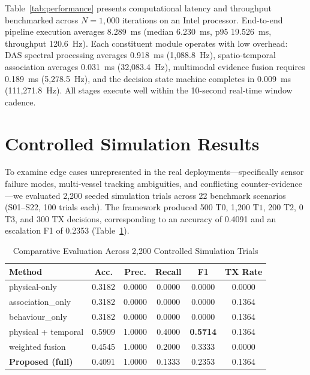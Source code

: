 \documentclass[conference]{IEEEtran}
\newcommand{\dstate}[1]{\ensuremath{\mathrm{#1}}}
\begin{document}
Table~\ref{tab:performance} presents computational latency and throughput benchmarked across $N=1{,}000$ iterations on an Intel processor. End-to-end pipeline execution averages 8.289~ms (median 6.230~ms, p95 19.526~ms, throughput 120.6~Hz). Each constituent module operates with low overhead: DAS spectral processing averages 0.918~ms (1{,}088.8~Hz), spatio-temporal association averages 0.031~ms (32{,}083.4~Hz), multimodal evidence fusion requires 0.189~ms (5{,}278.5~Hz), and the decision state machine completes in 0.009~ms (111{,}271.8~Hz). All stages execute well within the 10-second real-time window cadence.

\section{Controlled Simulation Results}
\label{sec:sim}

To examine edge cases unrepresented in the real deployments---specifically sensor failure modes, multi-vessel tracking ambiguities, and conflicting counter-evidence---we evaluated 2{,}200 seeded simulation trials across 22 benchmark scenarios (S01--S22, 100 trials each). The framework produced 500 \dstate{T0}, 1{,}200 \dstate{T1}, 200 \dstate{T2}, 0 \dstate{T3}, and 300 \dstate{TX} decisions, corresponding to an accuracy of 0.4091 and an escalation F1 of 0.2353 (Table~\ref{tab:sim-baselines}).

\begin{table}[!t]
\caption{Comparative Evaluation Across 2,200 Controlled Simulation Trials}
\label{tab:sim-baselines}
\centering
\footnotesize
\setlength{\tabcolsep}{3pt}
\begin{tabular}{@{}lccccc@{}}
\toprule
Method & Acc. & Prec. & Recall & F1 & TX Rate \\
\midrule
physical-only & 0.3182 & 0.0000 & 0.0000 & 0.0000 & 0.0000 \\
association\_only & 0.3182 & 0.0000 & 0.0000 & 0.0000 & 0.1364 \\
behaviour\_only & 0.3182 & 0.0000 & 0.0000 & 0.0000 & 0.1364 \\
physical + temporal & 0.5909 & 1.0000 & 0.4000 & \textbf{0.5714} & 0.1364 \\
weighted fusion & 0.4545 & 1.0000 & 0.2000 & 0.3333 & 0.0000 \\
\textbf{Proposed (full)} & 0.4091 & 1.0000 & 0.1333 & 0.2353 & 0.1364 \\
\bottomrule
\end{tabular}
\end{table}
\end{document}

